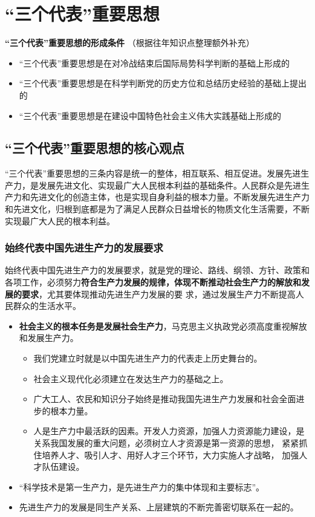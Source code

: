 \documentclass[12pt,openany]{ctexbook}
\begin{document}
\chapter{“三个代表”重要思想}
\textbf{“三个代表”重要思想的形成条件}
（根据往年知识点整理额外补充）
\begin{itemize}
  \item “三个代表”重要思想是在对冷战结束后国际局势科学判断的基础上形成的
  \item “三个代表”重要思想是在科学判断党的历史方位和总结历史经验的基础上提出的
  \item “三个代表”重要思想是在建设中国特色社会主义伟大实践基础上形成的
\end{itemize}
\section{“三个代表”重要思想的核心观点}
“三个代表”重要思想的三条内容是统一的整体，相互联系、相互促进。发展先进生产力，是发展先进文化、实现最广大人民根本利益的基础条件。人民群众是先进生产力和先进文化的创造主体，也是实现自身利益的根本力量。不断发展先进生产力和先进文化，归根到底都是为了满足人民群众日益增长的物质文化生活需要，不断实现最广大人民的根本利益。
\subsection{始终代表中国先进生产力的发展要求}
始终代表中国先进生产力的发展要求，就是党的理论、路线、纲领、方针、政策和各项工作，必须努力\textbf{符合生产力发展的规律，体现不断推动社会生产力的解放和发展的要求}，尤其要体现推动先进生产力发展的要 求，通过发展生产力不断提高人民群众的生活水平。
\begin{itemize}
  \item \textbf{社会主义的根本任务是发展社会生产力}，马克思主义执政党必须高度重视解放和发展生产力。
\begin{itemize}
  \item 我们党建立时就是以中国先进生产力的代表走上历史舞台的。
  \item 社会主义现代化必须建立在发达生产力的基础之上。
  \item 广大工人、农民和知识分子始终是推动我国先进生产力发展和社会全面进步的根本力量。
  \item 人是生产力中最活跃的因素。开发人力资源，加强人力资源能力建设，是关系我国发展的重大问题，必须树立人才资源是第一资源的思想， 紧紧抓住培养人才、吸引人才、用好人才三个环节，大力实施人才战略， 加强人才队伍建设。
\end{itemize}
  \item “科学技术是第一生产力，是先进生产力的集中体现和主要标志”。
  \item 先进生产力的发展是同生产关系、上层建筑的不断完善密切联系在一起的。
\end{itemize}
\end{document}
